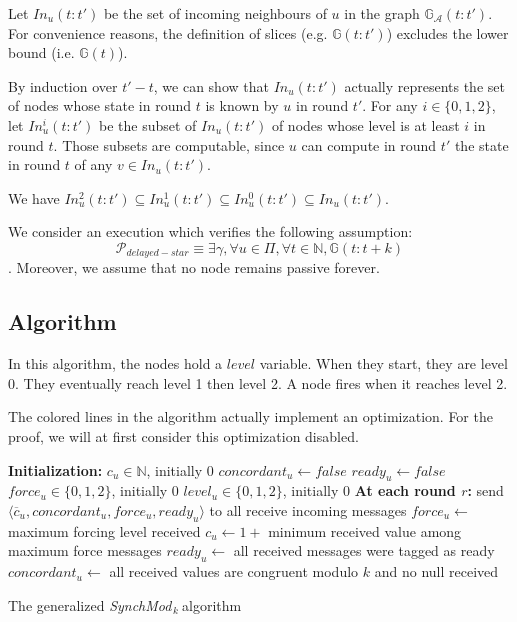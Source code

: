 \documentclass[11pt,letterpaper]{article}
\newcommand{\cent}{\gamma}
\newcommand{\SM}{{\em SynchMod}$_{\,k}\ $}
\begin{document}
Let $In_u(t:t')$ be the set of incoming neighbours of $u$ in the graph $\mathds{G}_\mathcal{A}(t:t')$.
For convenience reasons, the definition of slices (e.g. $\mathds{G}(t:t')$) excludes the lower bound (i.e. $\mathds{G}(t)$).

By induction over $t'-t$, we can show that $In_u(t:t')$ actually represents the set of nodes whose state in round $t$ is known by $u$ in round $t'$.
For any $i \in \{0, 1, 2\}$, let $In_u^i(t:t')$ be the subset of $In_u(t:t')$ of nodes whose level is at least $i$ in round $t$.
Those subsets are computable, since $u$ can compute in round $t'$ the state in round $t$ of any $v \in In_u(t:t')$.

We have $In_u^2(t:t') \subseteq In_u^1(t:t') \subseteq In_u^0(t:t') \subseteq In_u(t:t')$.

We consider an execution which verifies the following assumption:
$$\mathcal{P}_{delayed-star} \equiv \exists \cent, \forall u \in \Pi, \forall t \in \mathds{N}, \mathds{G}(t:t+k)$$.
Moreover, we assume that no node remains passive forever.

\subsection{Algorithm}

In this algorithm, the nodes hold a $level$ variable. When they start, they are level 0. They eventually reach level 1 then level 2.
A node fires when it reaches level 2.

The colored lines in the algorithm actually implement an optimization.
For the proof, we will at first consider this optimization disabled.

\begin{algorithm}[htb]
	\DontPrintSemicolon
	\textbf{Initialization:} \;
	\Indp
		$c_u \in \mathds{N}$, initially 0 \;
		$concordant_u \leftarrow false$ \;
		$ready_u \leftarrow false$ \;
		$force_u \in \{0, 1, 2\}$, initially 0 \;
		$level_u \in \{0, 1, 2\}$, initially 0 \;
	\BlankLine
	\Indm
	\textbf{At each round $r$:} \;
	\Indp
		send $\langle \overline{c}_u, concordant_u, force_u, ready_u \rangle$ to all  \;
		receive incoming messages \;
		$force_u \leftarrow$ maximum forcing level received \;\label{line:force}
		$c_u \leftarrow 1+$ minimum received value among maximum force messages \;\label{line:min-z-end} 
		$ready_u \leftarrow$ all received messages were tagged as ready \; \label{line:ready-gossip} 
		$concordant_u \leftarrow$ all received values are congruent modulo $k$ and no null received \; \label{line:conc-gossip}
	\Indm
\caption{The generalized \SM algorithm} 
\end{algorithm}
\end{document}
